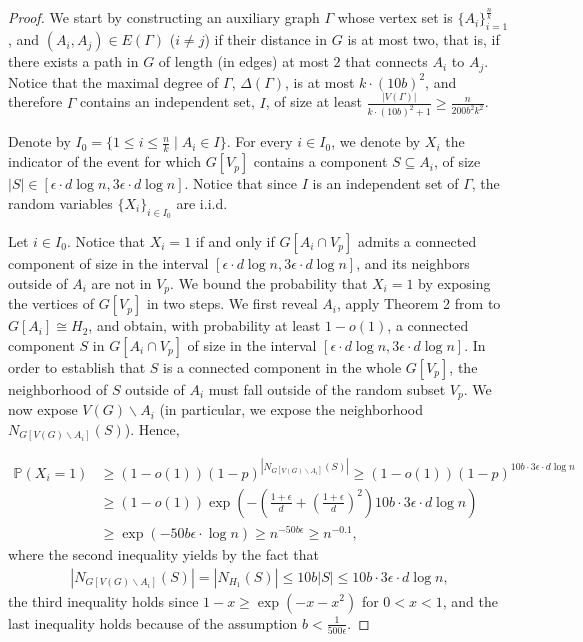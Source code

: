 \documentclass[notitlepage]{scrartcl}
\begin{document}
\begin{proof}
    We start by constructing an auxiliary graph $\Gamma$ whose vertex set is $\{A_i\}_{i=1}^{\frac{n}{k}}$, and $\left(A_i,A_j\right)\in E(\Gamma)$ ($i\neq j$) if their distance in $G$ is at most two, that is, if there exists a path in $G$ of length (in edges) at most $2$ that connects $A_i$ to $A_j$. Notice that the maximal degree of $\Gamma$, $\Delta(\Gamma)$, is at most $k\cdot (10b)^2$, and therefore $\Gamma$ contains an independent set, $I$, of size at least $\frac{|V(\Gamma)|}{k\cdot (10b)^2+1}\ge \frac{n}{200b^2k^2}$.
    
    Denote by $I_0=\{1\le i\le \frac{n}{k}\;|\; A_i\in I\}$. For every $i\in I_0$, we denote by $X_i$ the indicator of the event for which $G[V_p]$ contains a component $S\subseteq A_i$, of size $|S|\in [\epsilon\cdot d\log n,3\epsilon\cdot d\log n]$. Notice that since $I$ is an independent set of $\Gamma$, the random variables $\{X_i\}_{i\in I_0}$ are i.i.d.

    Let $i\in I_0$. Notice that $X_i=1$ if and only if $G[A_i\cap V_p]$ admits a connected component of size in the interval $[\epsilon\cdot d\log n,3\epsilon\cdot d\log n]$, and its neighbors outside of $A_i$ are not in $V_p$. We bound the probability that $X_i=1$ by exposing the vertices of $G[V_p]$ in two steps. We first reveal $A_i$, apply Theorem 2 from \cite{zbMATH07751060} to $G[A_i]\cong H_2$, and obtain, with probability at least $1-o(1)$, a connected component $S$ in $G[A_i\cap V_p]$ of size in the interval $[\epsilon\cdot d\log n,3\epsilon\cdot d\log n]$. In order to establish that $S$ is a connected component in the whole $G[V_p]$, the neighborhood of $S$ outside of $A_i$ must fall outside of the random subset $V_p$. We now expose $V(G)\backslash A_i$ (in particular, we expose the neighborhood $N_{G[V(G)\backslash A_i]}(S)$). Hence,
    
    \begin{align*}
        \mathbb{P}(X_i=1)&\ge (1-o(1))(1-p)^{\left|N_{G[V(G)\backslash A_i]}(S)\right|}\ge (1-o(1))(1-p)^{10b\cdot 3\epsilon\cdot d\log n}\\
        &\ge (1-o(1))\exp\left(-\left(\frac{1+\epsilon}{d}+\left(\frac{1+\epsilon}{d}\right)^2\right)10b\cdot 3\epsilon \cdot d\log n\right)\\
        &\ge \exp\left(-50b\epsilon\cdot \log n\right)\ge n^{-50b\epsilon}\ge n^{-0.1},
    \end{align*}
    where the second inequality yields by the fact that
    \begin{align*}
        |N_{G[V(G)\backslash A_i]}(S)|=|N_{H_1}(S)|\le 10b|S|\le 10b\cdot 3\epsilon \cdot d\log n,
    \end{align*}
    the third inequality holds since $1-x\ge \exp\left(-x-x^2\right)$ for $0<x<1$, and the last inequality holds because of the assumption $b< \frac{1}{500\epsilon}$.
    

\end{proof}
\end{document}
